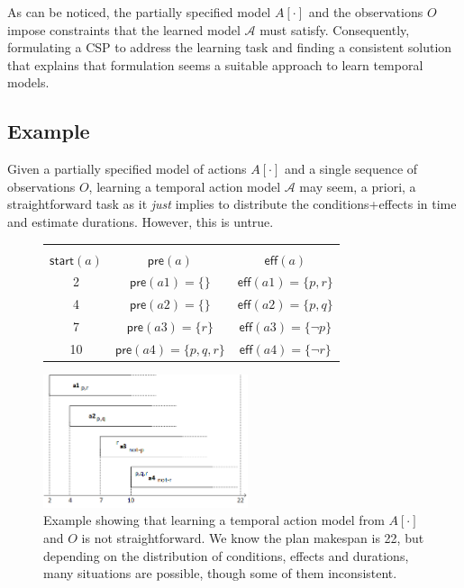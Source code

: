 \documentclass[runningheads]{llncs}
\newcommand{\pre}{\mathsf{pre}}    %
\newcommand{\eff}{\mathsf{eff}}    %
\newcommand{\start}{\mathsf{start}}%
\begin{document}
As can be noticed, the partially specified model $A[\cdot]$ and the observations $O$ impose constraints that the learned model $\mathcal{A}$ must satisfy. Consequently, formulating a CSP to address the learning task and finding a consistent solution that explains that formulation seems a suitable approach to learn temporal models.  
  
  
\subsection{Example}
  \label{sec:simpleTask}
Given a partially specified model of actions $A[\cdot]$ and a single sequence of observations $O$, learning a temporal action model $\mathcal{A}$  may seem, a priori, a straightforward task as it \emph{just} implies to distribute the conditions+effects in time and estimate durations. However, this is untrue.

\begin{figure}
  \begin{small}
    \begin{tabular}{c| c| c}
\vspace{-4cm}\\
$\start(a)$ &$\pre(a)$ &$\eff(a)$ \\\hline
2 &$\pre(a1)=\{\}$ &$\eff(a1)=\{p,r\}$ \\
4 &$\pre(a2)=\{\}$ &$\eff(a2)=\{p,q\}$ \\
7 &$\pre(a3)=\{r\}$ &$\eff(a3)=\{\neg p\}$ \\
10 &$\pre(a4)=\{p,q,r\}$ &$\eff(a4)=\{\neg r\}$ \\    
  \end{tabular}
  \end{small}    
\includegraphics[width=6cm]{ejemploacciones.png}
\caption{\small Example showing that learning a temporal action model from $A[\cdot]$ and $O$ is not straightforward. We know the plan makespan is 22, but depending on the distribution of conditions, effects and durations, many situations are possible, though some of them inconsistent.}
\label{fig:exampleplantrace}
\end{figure}
\end{document}
